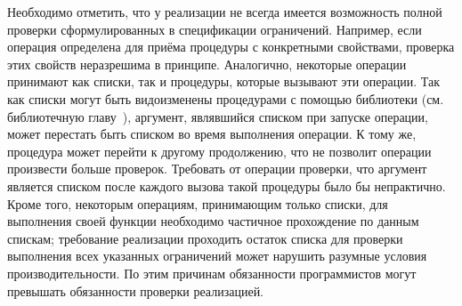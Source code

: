 Необходимо отметить, что у реализации не всегда имеется возможность полной проверки
сформулированных в спецификации ограничений. Например, если операция определена для приёма
процедуры с конкретными свойствами, проверка этих свойств неразрешима в принципе. Аналогично,
некоторые операции принимают как списки, так и процедуры, которые вызывают эти операции. Так как
списки могут быть видоизменены процедурами с помощью библиотеки \textbf{}
(см. библиотечную главу~), аргумент, являвшийся
списком при запуске операции, может перестать быть списком во время выполнения операции. К тому
же, процедура может перейти к другому продолжению, что не позволит операции произвести больше
проверок. Требовать от операции проверки, что аргумент является списком после каждого вызова
такой процедуры было бы непрактично. Кроме того, некоторым операциям, принимающим только
списки, для выполнения своей функции необходимо частичное прохождение по данным спискам; требование
реализации проходить остаток списка для проверки выполнения всех указанных ограничений
может нарушить разумные условия производительности. По этим причинам обязанности программистов
могут превышать обязанности проверки реализацией.

